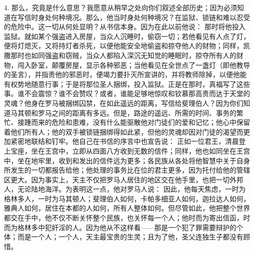 4. 那么，究竟是什么意思？我愿意从稍早之处向你们叙述全部历史；因为必须知道在写信时身处何种境况。那么，他当时身处何种境况？在监狱、锁链和难以忍受的危险中。这一切从何处显明？从书信本身。因为在此以前他说： 那时将他投入监狱。就如某个强盗进入房屋，当众人沉睡时，偷窃一切；若他看见有人点了灯，便将灯熄灭，又将持灯者杀死，以便他能安全地偷盗和掠夺他人的财物；同样，凯撒那时也如同强盗和窃贼，当众人都陷入深沉无知觉的睡眠时，掠夺所有人的财物，闯入卧室，颠覆房屋，显示各种邪恶；当他看见在全世点了一盏灯（即他教导的圣言），并指责他的邪恶时，便竭力要扑灭所宣讲的，并将教师除掉，以便他能有权势地随意行事；于是将那位圣人捆绑，投入监狱。正是在那时，真福写了这些事。谁不会震惊？谁不会赞叹？或者，谁能足够地惊叹和钦慕那高贵而达于天堂的灵魂？他身在罗马被捆绑囚禁，在如此遥远的距离，写信给斐理伯人？因为你们知道马其顿和罗马之间的距离有多远。但是，路途的遥远、所需的时间、事务的繁忙、接踵而来的危险和患难，没有什么能驱散他对门徒们的爱和记忆；他心中保留着他们所有人；他的双手被锁链捆绑得如此紧，但他的灵魂却因对门徒的渴望而更加紧密地联结和钉牢。他自己在书信的序言中也宣告说： 正如一位君王，清晨登上宝座，坐在王宫中，立即从四面八方收到无数的信件；同样，他也如同坐在王宫中，坐在地牢里，收到和发出的信件远为更多；各民族从各处将他智慧中关于自身所发生的一切都报告给他；他处理的事务比在位的君主更多，因为托付给他的管辖区更大。因为事实上，天主不仅把罗马人居住的地区交在他手里，也把一切外邦人，无论陆地海洋。为表明这一点，他对罗马人说： 因此，他每天焦虑，一时为格林多人，一时为马其顿人；斐理伯人如何，卡帕多细亚人如何，迦拉达人如何，雅典人如何，居住在本都的人如何，所有人整体如何。但尽管如此，他把整个世界都交在手中，他不仅不断关怀整个民族，也关怀每一个人；他时而为寄出信函，时而为格林多中犯奸淫的人。因为他从不这样看——那是一个犯了罪需要辩护的个体；而是一个人；一个人，天主最宝贵的生灵；且为了他，圣父连独生子都没有顾惜。\par

